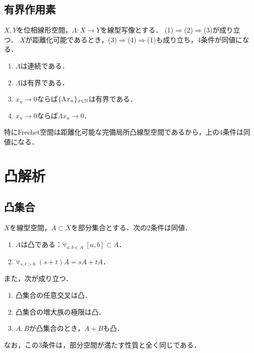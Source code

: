 \documentclass[uplatex,dvipdfmx]{jsreport}
\begin{document}
\subsection{有界作用素}

\begin{theorem}
    $X,Y$を位相線形空間，$\Lambda:X\to Y$を線型写像とする．
    (1)$\Rightarrow$(2)$\Rightarrow$(3)が成り立つ．
    $X$が距離化可能であるとき，(3)$\Rightarrow$(4)$\Rightarrow$(1)も成り立ち，4条件が同値になる．
    \begin{enumerate}
        \item $\Lambda$は連続である．
        \item $\Lambda$は有界である．
        \item $x_n\to 0$ならば$\{\Lambda x_n\}_{x\in\mathbb{N}}$は有界である．
        \item $x_n\to0$ならば$\Lambda x_n\to0$．
    \end{enumerate}
    特にFrechet空間は距離化可能な完備局所凸線型空間であるから，上の4条件は同値になる．
\end{theorem}

\section{凸解析}

\subsection{凸集合}

\begin{proposition}[凸集合の特徴付けと伝播]
    $X$を線型空間，$A\subset X$を部分集合とする．次の2条件は同値．
    \begin{enumerate}
        \item $A$は凸である：$\forall_{a,b\in A}\;[a,b]\subset A$．
        \item $\forall_{s,t>0}\;(s+t)A=sA+tA$．
    \end{enumerate}
    また，次が成り立つ．
    \begin{enumerate}
        \item 凸集合の任意交叉は凸．
        \item 凸集合の増大族の極限は凸．
        \item $A,B$が凸集合のとき，$A+B$も凸．
    \end{enumerate}
    なお，この3条件は，部分空間が満たす性質と全く同じである．
\end{proposition}
\end{document}
